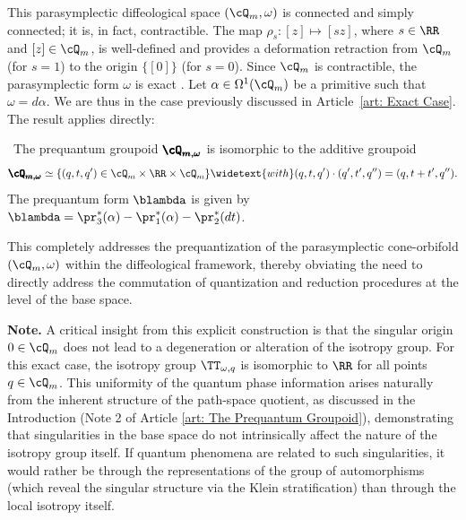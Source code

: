 \begin{article}
    This parasymplectic diffeological space $(\cQ_m,\omega)$ is connected and simply connected;
    it is,
    in fact,
    contractible.
    The map $\rho_s: [z] \mapsto [sz]$,
    where $s \in \RR$ and $[z] \in \cQ_m$,
    is well-defined and provides a deformation retraction from $\cQ_m$ (for $s=1$) to the origin $\{[0]\}$ (for $s=0$).
    Since $\cQ_m$ is contractible,
    the parasymplectic form $\omega$ is exact \cite[]{PIZ13}.
    Let $\alpha \in \Omega^1(\cQ_m)$ be a primitive such that $\omega = d\alpha$.
    We are thus in the case previously discussed in Article~\ref{art: Exact Case}.
    The result applies directly:
    
    \begin{proposition}{}%
      ~The prequantum groupoid ${\pmb{\cQ_{m,\omega}}}$ is isomorphic to the additive groupoid
      $$
        {\pmb{\cQ_{m,\omega}}} \simeq \{(q,t,q') \in \cQ_m \times \RR \times \cQ_m \}
        \widetext{with}
        (q,t,q') \cdot (q',t',q'') = (q,t+t',q'').
        $$
      The prequantum form $\blambda$ is given by $\blambda = \pr_3^*(\alpha) - \pr_1^*(\alpha) - \pr_2^*(dt)$.
    \end{proposition}
    
    This completely addresses the prequantization of the parasymplectic cone-orbifold $(\cQ_m,\omega)$ within the diffeological framework,
    thereby obviating the need to directly address the commutation of quantization and reduction procedures at the level of the base space.
    
    \textbf{Note.} A critical insight from this explicit construction is that the singular origin $0 \in \cQ_m$ does not lead to a degeneration or alteration of the isotropy group.
    For this exact case, the isotropy group $\TT_{\omega,q}$ is isomorphic to $\RR$ for all points $q \in \cQ_m$.
    This uniformity of the quantum phase information arises naturally from the inherent structure of the path-space quotient,
    as discussed in the Introduction (Note 2 of Article \ref{art: The Prequantum Groupoid}),
    demonstrating that singularities in the base space do not intrinsically affect the nature of the isotropy group itself.
    If quantum phenomena are related to such singularities, it would rather be through the representations of the group of automorphisms
    (which reveal the singular structure via the Klein stratification)
    than through the local isotropy itself.
    
  \end{article}
  
